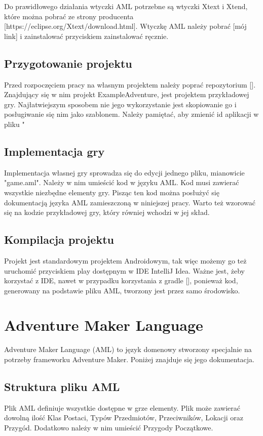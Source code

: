 \documentclass	{xmgr}
\begin{document}
Do prawidłowego działania wtyczki AML potrzebne są wtyczki Xtext i Xtend, które można pobrać ze strony producenta [https://eclipse.org/Xtext/download.html].
Wtyczkę AML należy pobrać [mój link] i zainstalować przyciskiem zainstalować ręcznie.

\section{Przygotowanie projektu}
Przed rozpoczęciem pracy na własnym projektem należy poprać repozytorium []. Znajdujący się w nim projekt ExampleAdventure, jest projektem przykładowej gry. Najłatwiejszym sposobem nie jego wykorzystanie jest skopiowanie go i posługiwanie się nim jako szablonem. Należy pamiętać, aby zmienić id aplikacji w pliku "

\section{Implementacja gry}
Implementacja własnej gry sprowadza się do edycji jednego pliku, mianowicie "game.aml". Należy w nim umieścić kod w języku AML. Kod musi  zawierać wszystkie niezbędne elementy gry. Pisząc ten kod można posłużyć się dokumentacją języka AML zamieszczoną w niniejszej pracy. Warto też wzorować się na kodzie przykładowej gry, który równiej wchodzi w jej skład.

\section{Kompilacja projektu}
Projekt jest standardowym projektem Androidowym, tak więc możemy go też uruchomić przyciskiem play dostępnym w IDE IntelliJ Idea. Ważne jest, żeby korzystać z IDE, nawet w przypadku korzystania z gradle [], ponieważ kod, generowany na podstawie pliku AML, tworzony jest przez samo środowisko.

\chapter{Adventure Maker Language} 
Adventure Maker Language (AML) to język domenowy stworzony specjalnie na potrzeby frameworku Adventure Maker. Poniżej znajduje się jego dokumentacja.

\section{Struktura pliku AML} 
Plik AML definiuje wszystkie dostępne w grze elementy. Plik może zawierać dowolną ilość Klas Postaci, Typów Przedmiotów, Przeciwników, Lokacji oraz Przygód. Dodatkowo należy w nim umieścić Przygody Początkowe. 
\end{document}
